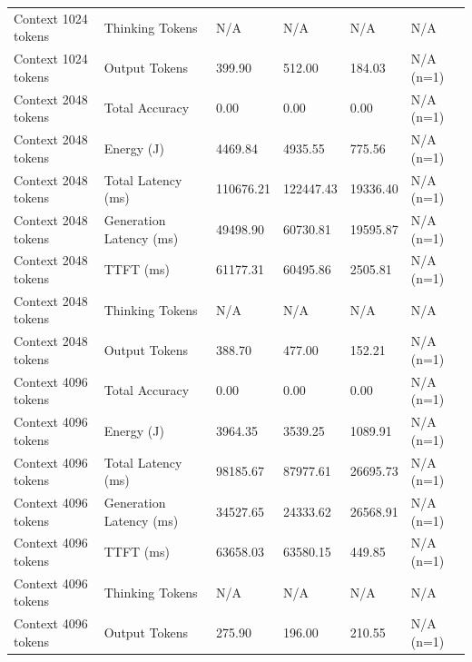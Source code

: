 \begin{table}
\begin{tabular}{llllll}
Context 1024 tokens & Thinking Tokens & N/A & N/A & N/A & N/A \\
Context 1024 tokens & Output Tokens & 399.90 & 512.00 & 184.03 & N/A (n=1) \\
Context 2048 tokens & Total Accuracy & 0.00 & 0.00 & 0.00 & N/A (n=1) \\
Context 2048 tokens & Energy (J) & 4469.84 & 4935.55 & 775.56 & N/A (n=1) \\
Context 2048 tokens & Total Latency (ms) & 110676.21 & 122447.43 & 19336.40 & N/A (n=1) \\
Context 2048 tokens & Generation Latency (ms) & 49498.90 & 60730.81 & 19595.87 & N/A (n=1) \\
Context 2048 tokens & TTFT (ms) & 61177.31 & 60495.86 & 2505.81 & N/A (n=1) \\
Context 2048 tokens & Thinking Tokens & N/A & N/A & N/A & N/A \\
Context 2048 tokens & Output Tokens & 388.70 & 477.00 & 152.21 & N/A (n=1) \\
Context 4096 tokens & Total Accuracy & 0.00 & 0.00 & 0.00 & N/A (n=1) \\
Context 4096 tokens & Energy (J) & 3964.35 & 3539.25 & 1089.91 & N/A (n=1) \\
Context 4096 tokens & Total Latency (ms) & 98185.67 & 87977.61 & 26695.73 & N/A (n=1) \\
Context 4096 tokens & Generation Latency (ms) & 34527.65 & 24333.62 & 26568.91 & N/A (n=1) \\
Context 4096 tokens & TTFT (ms) & 63658.03 & 63580.15 & 449.85 & N/A (n=1) \\
Context 4096 tokens & Thinking Tokens & N/A & N/A & N/A & N/A \\
Context 4096 tokens & Output Tokens & 275.90 & 196.00 & 210.55 & N/A (n=1) \\
\bottomrule
\end{tabular}
\end{table}
